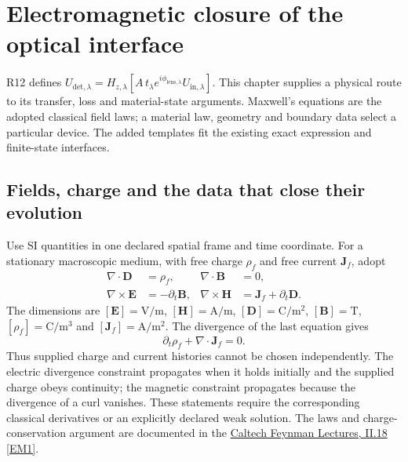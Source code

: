 \section{Electromagnetic closure of the optical interface}
\label{sec:r13-em-laws}

\begin{panel}
R12 defines $U_{\mathrm{det},\lambda}=H_{z,\lambda}[A\,t_\lambda
e^{i\phi_{\mathrm{lens},\lambda}}U_{\mathrm{in},\lambda}]$.
This chapter supplies a physical route to its transfer, loss and material-state
arguments. Maxwell's equations are the adopted classical field laws; a material
law, geometry and boundary data select a particular device. The added
templates fit the existing exact expression and finite-state interfaces.
\end{panel}

\subsection{Fields, charge and the data that close their evolution}
\label{sec:r13-em-maxwell}

Use SI quantities in one declared spatial frame and time coordinate. For a
stationary macroscopic medium, with free charge $\rho_f$ and free current
$\mathbf J_f$, adopt
\begin{align}
 \nabla\cdot\mathbf D&=\rho_f,& \nabla\cdot\mathbf B&=0,\nonumber\\
 \nabla\times\mathbf E&=-\partial_t\mathbf B,&
 \nabla\times\mathbf H&=\mathbf J_f+\partial_t\mathbf D.
 \label{eq:r13-em-maxwell}
\end{align}
The dimensions are $[\mathbf E]=\mathrm{V/m}$,
$[\mathbf H]=\mathrm{A/m}$, $[\mathbf D]=\mathrm{C/m^2}$,
$[\mathbf B]=\mathrm{T}$, $[\rho_f]=\mathrm{C/m^3}$ and
$[\mathbf J_f]=\mathrm{A/m^2}$. The divergence of the last equation gives
\begin{equation}
 \partial_t\rho_f+\nabla\cdot\mathbf J_f=0.
 \label{eq:r13-em-charge}
\end{equation}
Thus supplied charge and current histories cannot be chosen independently.
The electric divergence constraint propagates when it holds initially and
the supplied charge obeys continuity; the magnetic constraint propagates
because the divergence of a curl vanishes. These statements require the
corresponding classical derivatives or an explicitly declared weak solution.
The laws and charge-conservation argument are documented in the
\href{https://www.feynmanlectures.caltech.edu/II_18.html}{Caltech Feynman Lectures, II.18 [EM1]}.

